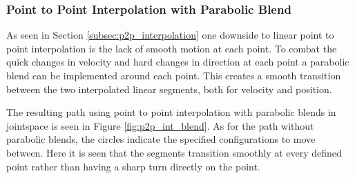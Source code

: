 \documentclass[../main.tex]{subfiles}
\begin{document}
\subsubsection{Point to Point Interpolation with Parabolic Blend} \label{subsec:p2p_interpolation_parabolic_blend}
As seen in Section \ref{subsec:p2p_interpolation} one downside to linear point to point interpolation is the lack of smooth motion at each point. To combat the quick changes in velocity and hard changes in direction at each point a parabolic blend can be implemented around each point. This creates a smooth transition between the two interpolated linear segments, both for velocity and position.

The resulting path using point to point interpolation with parabolic blends in jointspace is seen in Figure \ref{fig:p2p_int_blend}. As for the path without parabolic blends, the circles indicate the specified configurations to move between. Here it is seen that the segments transition smoothly at every defined point rather than having a sharp turn directly on the point.
\end{document}
